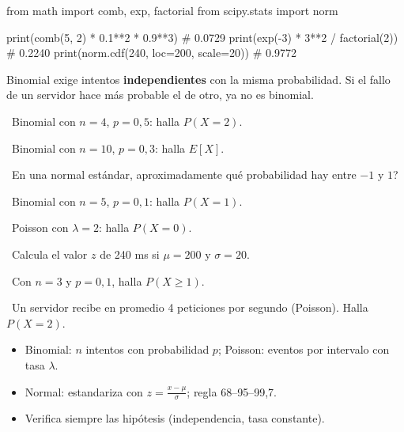 \begin{tmcodigo}
from math import comb, exp, factorial
from scipy.stats import norm

print(comb(5, 2) * 0.1**2 * 0.9**3)          # 0.0729
print(exp(-3) * 3**2 / factorial(2))         # 0.2240
print(norm.cdf(240, loc=200, scale=20))      # 0.9772
\end{tmcodigo}

\begin{tmcuidado}Binomial exige intentos \textbf{independientes} con la misma probabilidad. Si el fallo de un servidor hace m\'as probable el de otro, ya no es binomial.\end{tmcuidado}

\begin{tmejercicios}
\label{ej:5-3}
\begin{tmlista}
\item \tmbasico\ Binomial con $n=4$, $p=0{,}5$: halla $P(X=2)$.
\item \tmbasico\ Binomial con $n=10$, $p=0{,}3$: halla $E[X]$.
\item \tmbasico\ En una normal est\'andar, \textquestiondown aproximadamente qu\'e probabilidad hay entre $-1$ y $1$?
\item \tmmedio\ Binomial con $n=5$, $p=0{,}1$: halla $P(X=1)$.
\item \tmmedio\ Poisson con $\lambda=2$: halla $P(X=0)$.
\item \tmmedio\ Calcula el valor $z$ de 240 ms si $\mu=200$ y $\sigma=20$.
\item \tmdificil\ Con $n=3$ y $p=0{,}1$, halla $P(X\ge1)$.
\item \tmdificil\ Un servidor recibe en promedio 4 peticiones por segundo (Poisson). Halla $P(X=2)$.
\end{tmlista}
\end{tmejercicios}


\begin{tmresumen}
\begin{itemize}
\item Binomial: $n$ intentos con probabilidad $p$; Poisson: eventos por intervalo con tasa $\lambda$.
\item Normal: estandariza con $z=\frac{x-\mu}\sigma$; regla 68--95--99,7.
\item Verifica siempre las hip\'otesis (independencia, tasa constante).
\end{itemize}
\end{tmresumen}

